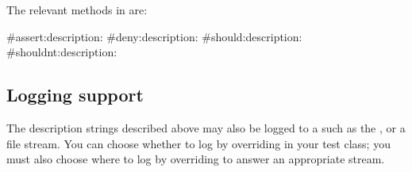 \documentclass[a4paper,10pt,twoside]{book}
\begin{document}
The relevant methods in  are:
\begin{code}{}
#assert:description:
#deny:description:
#should:description:
#shouldnt:description:
\end{code}

\subsection{Logging support}
The description strings described above may also be logged to a  such as the , or a file stream.
You can choose whether to log by overriding  in your test class; you must also choose where to log by overriding  to answer an appropriate stream.

\end{document}
